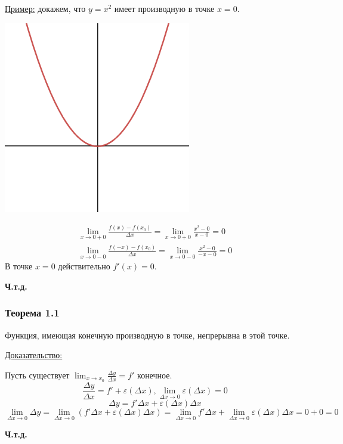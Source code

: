 \documentclass[12pt]{article}
\begin{document}
    \underline{Пример:} докажем, что $y = x^2$ имеет производную в точке $x=0$.
    \begin{adjustwidth}{1.5em}{1.5em}
        \begin{center}
            \includegraphics{4.1.2.png}
        \end{center}
        \begin{gather*}
            \lim_{x \to 0+0}\frac{f(x) - f(x_0)}{\Delta x} = \lim_{x\to 0+0} \frac{x^2 - 0}{x - 0} = 0\\
            \lim_{x \to 0-0}\frac{f(-x) - f(x_0)}{\Delta x} = \lim_{x\to 0-0} \frac{x^2 - 0}{-x-0} = 0
        \end{gather*}
        В точке $x = 0$ действительно $f'(x) = 0$.
        \begin{center}
            \textbf{Ч.т.д.}
        \end{center}
    \end{adjustwidth}
    
    \subsubsection*{Теорема 1.1}
    Функция, имеющая конечную производную в точке, непрерывна в этой точке.\par\noindent
    \underline{Доказательство:}
    \begin{adjustwidth}{1.5em}{1.5em}
        Пусть существует $\lim_{x\to x_0} \frac{\Delta y}{\Delta x} = f'$ конечное.
        \[ \frac{\Delta y}{\Delta x} = f' + \varepsilon(\Delta x), \lim_{\Delta x \to 0}\varepsilon(\Delta x) = 0 \]
        \[ \Delta y = f' \Delta x + \varepsilon(\Delta x)\Delta x \]
        \[ \lim_{\Delta x \to 0} \Delta y = \lim_{\Delta x \to 0} (f' \Delta x + \varepsilon(\Delta x)\Delta x) = \lim_{\Delta x \to 0} f'\Delta x + \lim_{\Delta x \to 0} \varepsilon(\Delta x)\Delta x = 0 + 0 = 0 \]
        \begin{center}
            \textbf{Ч.т.д.}
        \end{center}
    \end{adjustwidth}
\end{document}
